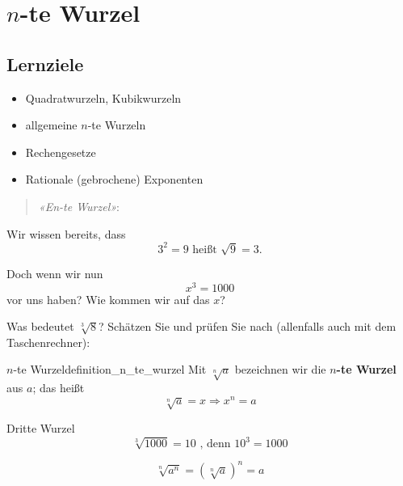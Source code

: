 
\section{$n$-te Wurzel}

\subsection*{Lernziele}

\begin{itemize}
\item Quadratwurzeln, Kubikwurzeln
\item allgemeine $n$-te Wurzeln
\item Rechengesetze
\item Rationale (gebrochene) Exponenten
\end{itemize}
\newpage


\begin{verse}
\textit{«En-te Wurzel»}:
\end{verse}

Wir wissen bereits, dass
$$3^2 = 9 \textrm{ heißt } \sqrt{9} = 3.$$



Doch wenn wir nun
$$x^3 = 1000$$
vor uns haben? Wie kommen wir auf das $x$?



Was bedeutet $\sqrt[3]{8}$? Schätzen Sie und prüfen Sie nach (allenfalls auch mit dem Taschenrechner):




\newpage
\begin{definition}{$n$-te Wurzel}{definition_n_te_wurzel}
Mit $\sqrt[n]{a}$ bezeichnen wir die $n$\textbf{-te Wurzel} aus $a$; das heißt
$$\sqrt[n]{a} = x \Rightarrow x^n = a$$
\end{definition}

\begin{beispiel}{Dritte Wurzel}{}
$$\sqrt[3]{1000} = 10 \textrm{ , denn } 10^3 = 1000$$
\end{beispiel}

\begin{gesetz}{}{}
$$\sqrt[n]{a^n} = \left(\sqrt[n]a\right)^n = a$$
\end{gesetz}


